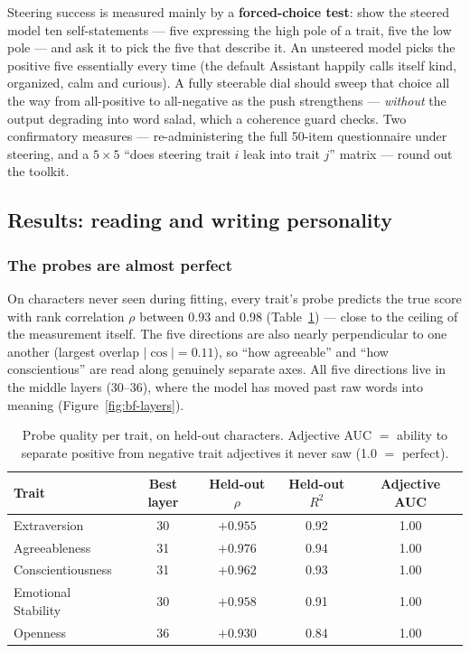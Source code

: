 \documentclass[11pt]{article}
\begin{document}
Steering success is measured mainly by a \textbf{forced-choice test}: show the
steered model ten self-statements --- five expressing the high pole of a trait,
five the low pole --- and ask it to pick the five that describe it. An unsteered
model picks the positive five essentially every time (the default Assistant
happily calls itself kind, organized, calm and curious). A fully steerable dial
should sweep that choice all the way from all-positive to all-negative as the
push strengthens --- \emph{without} the output degrading into word salad, which
a coherence guard checks. Two confirmatory measures --- re-administering the
full 50-item questionnaire under steering, and a $5\times5$ ``does steering
trait $i$ leak into trait $j$'' matrix --- round out the toolkit.

\subsection{Results: reading and writing personality}

\subsubsection{The probes are almost perfect}

On characters never seen during fitting, every trait's probe predicts the true
score with rank correlation $\rho$ between 0.93 and 0.98
(Table~\ref{tab:bf-g1}) --- close to the ceiling of the measurement itself. The
five directions are also nearly perpendicular to one another (largest overlap
$|\cos| = 0.11$), so ``how agreeable'' and ``how conscientious'' are read along
genuinely separate axes. All five directions live in the middle layers
(30--36), where the model has moved past raw words into meaning
(Figure~\ref{fig:bf-layers}).

\begin{table}[h]
\centering\small
\caption{Probe quality per trait, on held-out characters. Adjective AUC $=$
ability to separate positive from negative trait adjectives it never saw
(1.0 $=$ perfect).}
\label{tab:bf-g1}
\begin{tabular}{lcccc}
\toprule
Trait & Best layer & Held-out $\rho$ & Held-out $R^2$ & Adjective AUC \\
\midrule
Extraversion        & 30 & $+0.955$ & 0.92 & 1.00 \\
Agreeableness       & 31 & $+0.976$ & 0.94 & 1.00 \\
Conscientiousness   & 31 & $+0.962$ & 0.93 & 1.00 \\
Emotional Stability & 30 & $+0.958$ & 0.91 & 1.00 \\
Openness            & 36 & $+0.930$ & 0.84 & 1.00 \\
\bottomrule
\end{tabular}
\end{table}
\end{document}

